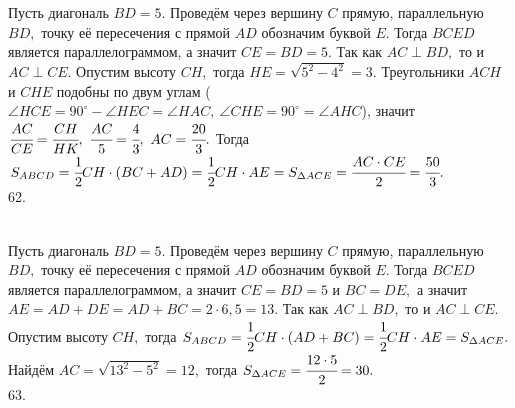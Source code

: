 \documentclass[12pt]{article}
\begin{document}
Пусть диагональ $BD=5.$ Проведём через вершину $C$ прямую, параллельную $BD,$ точку её пересечения с прямой $AD$ обозначим буквой $E.$ Тогда $BCED$ является параллелограммом, а значит $CE=BD=5.$ Так как $AC\perp BD,$ то и $AC\perp CE.$ Опустим высоту $CH,$ тогда $HE=\sqrt{5^2-4^2}=3.$ Треугольники $ACH$ и $CHE$ подобны по двум углам ($\angle HCE=90^\circ-\angle HEC=\angle HAC,\ \angle CHE=90^\circ=\angle AHC$), значит $\cfrac{AC}{CE}=\cfrac{CH}{HK},\ \cfrac{AC}{5}=\cfrac{4}{3},\ AC=\cfrac{20}{3}.$ Тогда $S_{ABCD}=\cfrac{1}{2}CH\cdot(BC+AD)=\cfrac{1}{2}CH\cdot AE=S_{\Delta ACE}=\cfrac{AC\cdot CE}{2}=\cfrac{50}{3}.$\\
62. \begin{figure}[ht!]
\end{figure}\\
Пусть диагональ $BD=5.$ Проведём через вершину $C$ прямую, параллельную $BD,$ точку её пересечения с прямой $AD$ обозначим буквой $E.$ Тогда $BCED$ является параллелограммом, а значит $CE=BD=5$ и $BC=DE,$ а значит $AE=AD+DE=AD+BC=2\cdot6,5=13.$ Так как $AC\perp BD,$ то и $AC\perp CE.$
Опустим высоту $CH,$ тогда $S_{ABCD}=\cfrac{1}{2} CH\cdot (AD+BC)=\cfrac{1}{2} CH\cdot AE=S_{\Delta ACE}.$ Найдём $AC=\sqrt{13^2-5^2}=12,$ тогда $S_{\Delta ACE}=\cfrac{12\cdot5}{2}=30.$\\
63. \begin{figure}[ht!]
\end{figure}\\
\end{document}
